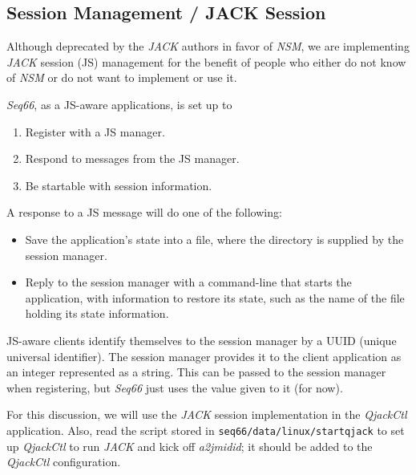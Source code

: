 \subsection{Session Management / JACK Session}
\label{subsec:sessions_jack}

   Although deprecated by the \textsl{JACK} authors in favor of \textsl{NSM},
   we are implementing \textsl{JACK} session (JS) management for the benefit of
   people who either do not know of \textsl{NSM} or do not want to implement or
   use it.

   \textsl{Seq66}, as a JS-aware applications, is set up to

   \begin{enumerate}
      \item Register with a JS manager.
      \item Respond to messages from the JS manager.
      \item Be startable with session information.
   \end{enumerate}

   A response to a JS message will do one of the following:

   \begin{itemize}
      \item Save the application's state into a file, where the directory is
         supplied by the session manager.
      \item Reply to the session manager with a command-line that starts the
         application, with information to restore its state, such as
         the name of the file holding its state information.
   \end{itemize}

	JS-aware clients identify themselves to the session manager by a UUID
	(unique universal identifier). The session manager provides it to
	the client application as an integer represented as a string.
   This can be passed to the session manager when registering, but
   \textsl{Seq66} just uses the value given to it (for now).


   For this discussion, we will use the \textsl{JACK} session implementation in
   the \textsl{QjackCtl} application.
   Also, read the script stored in
   \texttt{seq66/data/linux/startqjack} to set up
   \textsl{QjackCtl} to run \textsl{JACK} and kick off
   \textsl{a2jmidid}; it should be added to the \textsl{QjackCtl}
   configuration.


